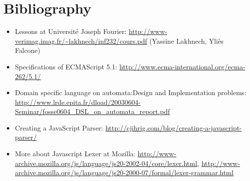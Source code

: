 \documentclass{article}
\begin{document}
\begin{sloppypar}
\section{ Bibliography}


\begin{itemize}
	\item{ Lessons at Université Joseph Fourier: \href{http://www-verimag.imag.fr/~lakhnech/inf232/cours.pdf}{http://www-verimag.imag.fr/\textasciitilde lakhnech/inf232/cours.pdf} (Yassine Lakhnech, Yliès Falcone)}
	\item{ Specifications of ECMAScript 5.1: \href{http://www.ecma-international.org/ecma-262/5.1/}{http://www.ecma-international.org/ecma-262/5.1/}}
	\item{ Domain specific language on automata:Design and Implementation problems: \href{http://www.lrde.epita.fr/dload/20030604-Seminar/fosse0604\_DSL\_on\_automata\_report.pdf}{http://www.lrde.epita.fr/dload/20030604-Seminar/fosse0604\_DSL\_on\_automata\_report.pdf}}
	\item{ Creating a JavaScript Parser: \href{http://cjihrig.com/blog/creating-a-javascript-parser/}{http://cjihrig.com/blog/creating-a-javascript-parser/}}
	\item{ More about Javascript Lexer at Mozilla: \href{http://www-archive.mozilla.org/js/language/js20-2002-04/core/lexer.html}{http://www-archive.mozilla.org/js/language/js20-2002-04/core/lexer.html}, \href{http://www-archive.mozilla.org/js/language/js20-2000-07/formal/lexer-grammar.html}{http://www-archive.mozilla.org/js/language/js20-2000-07/formal/lexer-grammar.html}}
\end{itemize}
\end{sloppypar}
\end{document}
